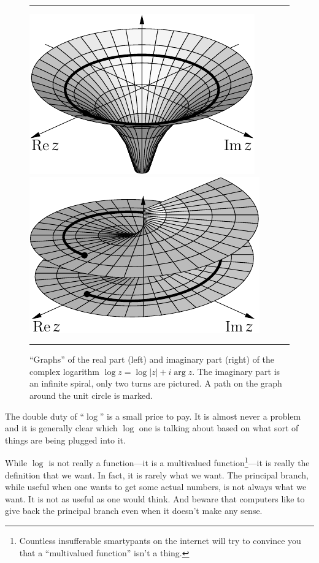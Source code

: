 \documentclass[12pt,openany]{book}
\newcommand{\sabs}[1]{\lvert {#1} \rvert}
\theoremstyle{plain}
\theoremstyle{remark}
\theoremstyle{definition}
\newenvironment{myfig}{%
\begin{figure}[h!t]
\noindent\rule{\textwidth}{0.4pt}\vspace{12pt}\par\centering}%
{\par\noindent\rule{\textwidth}{0.4pt}
\end{figure}}
\theoremstyle{exercise}
\theoremstyle{example}
\begin{document}
\begin{myfig}
\includegraphics{figures/logrealgraph}
\qquad
\includegraphics{figures/arggraph2}
\caption{``Graphs'' of the real part (left) and imaginary part (right)
of the complex logarithm $\log z = \log \sabs{z} + i \arg z$.  The imaginary
part is an infinite spiral, only two turns are pictured.  A path on the
graph around the unit circle is marked.\label{fig:loggraph}}
\end{myfig}

The double duty of ``$\log$'' is a small price to pay.  It is almost never a
problem and it is generally clear which $\log$ one is talking about based on
what sort of things are being plugged into it.

While $\log$ is not really a function---it is a multivalued
function\footnote{%
Countless insufferable smartypants on the internet will try to convince
you that a ``multivalued function'' isn't a thing.}---it is really
the definition that we want.  In fact, it is rarely what we want.
The principal branch, while 
useful when one wants to get some actual numbers, is not always what we
want.  It is not as useful as one would think.
And beware that computers like to give back the principal branch even 
when it doesn't make any sense.
\end{document}
